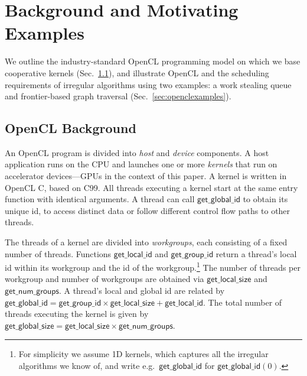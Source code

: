 \documentclass[numbers,nocopyrightspace,10pt]{sigplanconf}
\newcommand{\mysec}{Sec.~}
\newcommand{\getgroupid}{\mathsf{get\_group\_id}}
\newcommand{\getnumgroups}{\mathsf{get\_num\_groups}}
\newcommand{\getlocalid}{\mathsf{get\_local\_id}}
\newcommand{\getglobalid}{\mathsf{get\_global\_id}}
\newcommand{\getlocalsize}{\mathsf{get\_local\_size}}
\newcommand{\getglobalsize}{\mathsf{get\_global\_size}}
\begin{document}
\section{Background and Motivating Examples}\label{sec:background}

We outline the industry-standard OpenCL programming model on which we
base cooperative kernels (\mysec\ref{sec:opencl}), and illustrate
OpenCL and the scheduling requirements of irregular algorithms using two examples: a work stealing queue and frontier-based graph traversal
(\mysec\ref{sec:openclexamples}).

\subsection{OpenCL Background}\label{sec:opencl}



An OpenCL program is divided into \emph{host} and \emph{device}
components.  A host application runs on the CPU and launches one or
more \emph{kernels} that run on accelerator devices---GPUs in the
context of this paper.  A kernel is written in OpenCL C, based on C99.
All threads executing a kernel start at the same entry function with
identical arguments.  A thread can call $\getglobalid$
to obtain its unique id, to access distinct data or follow different control flow paths to other threads.

The threads of a kernel are divided into \emph{workgroups}, each consisting of a fixed number of threads.  Functions
$\getlocalid$ and $\getgroupid$ return a thread's local id within
its workgroup and the id of the workgroup.\footnote{For simplicity we assume 1D kernels, which captures all the
irregular algorithms we know of, and write
e.g.\ $\getglobalid$ for $\getglobalid(0)$.
}  The number
of threads per workgroup and number of workgroups are obtained via
$\getlocalsize$ and $\getnumgroups$.  A thread's local and global
id are related by $\getglobalid = \getgroupid \times
\getlocalsize + \getlocalid$.  The total number of threads executing the
kernel is given by $\getglobalsize = \getlocalsize \times \getnumgroups$.
\end{document}
